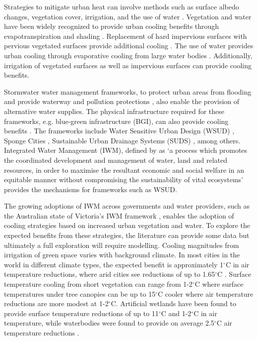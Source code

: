 \documentclass[utf8]{frontiersSCNS} %
\begin{document}
Strategies to mitigate urban heat can involve methods such as surface albedo changes, vegetation cover, irrigation, and the use of water \citep{Krayenhoff2021}. Vegetation and water have been widely recognized to provide urban cooling benefits through evapotranspiration and shading \citep{Bowler2010,Coutts2012,Demuzere2014a,Coutts2015}. Replacement of hard impervious surfaces with pervious vegetated surfaces provide additional cooling \citep{Middel2019a}. The use of water provides urban cooling through evaporative cooling from large water bodies \citep{Theeuwes2013,Volker2013}. Additionally, irrigation of vegetated surfaces \citep{Broadbent2017a,Cheung2021} as well as impervious surfaces \citep{Hendel2016,Solcerova2018} can provide cooling benefits.

Stormwater water management frameworks, to protect urban areas from flooding and provide waterway and pollution protections \citep{Whiteoak2019b,Renouf2020a}, also enable the provision of alternative water supplies. The physical infrastructure required for these frameworks, e.g. blue-green infrastructure (BGI), can also provide cooling benefits \citep{Demuzere2014b,Jamei2019,Probst2022}. The frameworks include  Water Sensitive Urban Design (WSUD) \citep{Wong2009,Newton2020}, Sponge Cities \citep{Jia2020}, Sustainable Urban Drainage Systems (SUDS) \citep{Woods-Ballard2007}, among others. Integrated Water Management (IWM), defined by \cite{GWP2000} as `a process which promotes the coordinated development and management of water, land and related resources, in order to maximise the resultant economic and social welfare in an equitable manner without compromising the sustainability of vital ecosystems' provides the mechanisms for frameworks such as WSUD.

The growing adoptions of IWM across governments and water providers, such as the Australian state of Victoria's IWM framework \citep{VIC_DELWP2017}, enables the adoption of cooling strategies based on increased urban vegetation and water. To explore the expected benefits from these strategies, the literature can provide some data but ultimately a full exploration will require modelling. Cooling magnitudes from irrigation of green space varies with background climate. In most cities in the world in different climate types, the expected benefit is approximately 1$^{\circ}$C in air temperature reductions, where arid cities see reductions of up to 1.65$^{\circ}$C \citep{Cheung2021}. Surface temperature cooling from short vegetation \citep{Santamouris2017,Yang2020} can range from 1-2$^{\circ}$C where surface temperatures under tree canopies \citep{Shashua-Bar2000,Cheung2018,Jia2021} can be up to 15$^{\circ}$C cooler where air temperature reductions are more modest at 1-2$^{\circ}$C. Artificial wetlands have been found to provide surface temperature reductions of up to 11$^{\circ}$C and 1-2$^{\circ}$C in air temperature, while waterbodies were found to provide on average 2.5$^{\circ}$C air temperature reductions \citep{Theeuwes2013,Volker2013,Manteghi2015,Broadbent2017a}.
\end{document}

